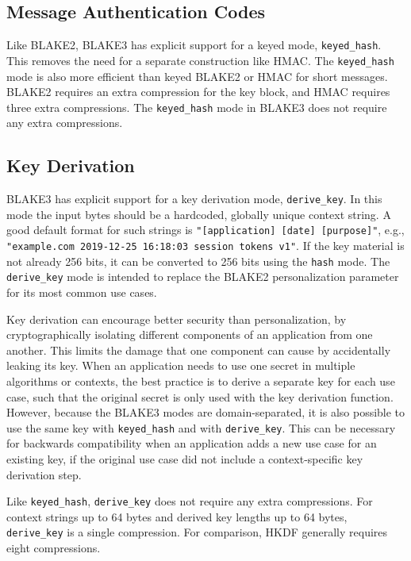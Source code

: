 \documentclass[12pt,notitlepage,a4paper]{article}
\begin{document}
\subsection{Message Authentication Codes}\label{sec:mac}

Like BLAKE2, BLAKE3 has explicit support for a keyed mode,
\texttt{keyed\_hash}. This removes the need for a separate construction like
HMAC. The \texttt{keyed\_hash} mode is also more efficient than keyed BLAKE2 or
HMAC for short messages. BLAKE2 requires an extra compression for the key
block, and HMAC requires three extra compressions. The \texttt{keyed\_hash}
mode in BLAKE3 does not require any extra compressions.

\subsection{Key Derivation}\label{sec:kdf}

BLAKE3 has explicit support for a key derivation mode, \texttt{derive\_key}. In
this mode the input bytes should be a hardcoded, globally unique context
string. A good default format for such strings is \texttt{"[application] [date]
[purpose]"}, e.g., \texttt{"example.com 2019-12-25 16:18:03 session tokens
v1"}. If the key material is not already 256 bits, it can be converted to 256
bits using the \texttt{hash} mode. The \texttt{derive\_key} mode is intended to
replace the BLAKE2 personalization parameter for its most common use cases.

Key derivation can encourage better security than personalization, by
cryptographically isolating different components of an application from one
another. This limits the damage that one component can cause by accidentally
leaking its key. When an application needs to use one secret in multiple
algorithms or contexts, the best practice is to derive a separate key for each
use case, such that the original secret is only used with the key derivation
function. However, because the BLAKE3 modes are domain-separated, it is also
possible to use the same key with \texttt{keyed\_hash} and with
\texttt{derive\_key}. This can be necessary for backwards compatibility when an
application adds a new use case for an existing key, if the original use case
did not include a context-specific key derivation step.

Like \texttt{keyed\_hash}, \texttt{derive\_key} does not require any extra
compressions. For context strings up to 64 bytes and derived key lengths up to
64 bytes, \texttt{derive\_key} is a single compression. For comparison, HKDF
generally requires eight compressions.
\end{document}
